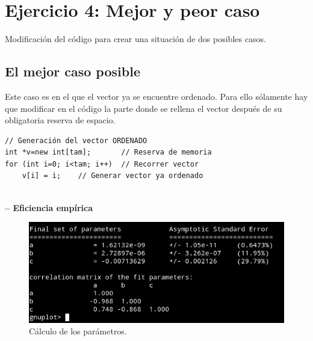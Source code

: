 \newpage

\section{Ejercicio 4: Mejor y peor caso}

Modificación del código para crear una situación de dos posibles casos.
\subsection{El mejor caso posible}
	
		Este caso es en el que el vector ya se encuentre ordenado. Para ello sólamente hay que modificar en el código la parte donde se rellena el vector después de su obligatoria reserva de espacio.
\begin {lstlisting}
// Generación del vector ORDENADO
int *v=new int[tam];       // Reserva de memoria
for (int i=0; i<tam; i++)  // Recorrer vector
	v[i] = i;    // Generar vector ya ordenado
	
\end{lstlisting}
	
\textbf{-- Eficiencia empírica}
\begin{figure}[H] %
\centering
\includegraphics[scale=0.5]{ejercicio4/plotMejor.png}  
\caption{Cálculo de los parámetros.} 
\label{fig:figura4-1}
\end{figure}

